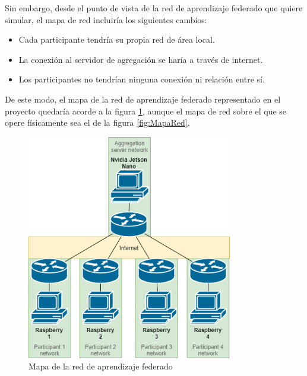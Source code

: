 Sin embargo, desde el punto de vista de la red de aprendizaje federado que quiere simular, el mapa de red incluiría los siguientes cambios:
\begin{itemize}
    \item Cada participante tendría su propia red de área local.
    \item La conexión al servidor de agregación se haría a través de internet.
    \item Los participantes no tendrían ninguna conexión ni relación entre sí.
\end{itemize}
De este modo, el mapa de la red de aprendizaje federado representado en el proyecto quedaría acorde a la figura \ref{fig:FLMapaRed}, aunque el mapa de red sobre el que se opere físicamente sea el de la figura \ref{fig:MapaRed}.

\begin{figure}[H]
    \centering
    \includegraphics[width=0.8\textwidth]{Figuras/FL_network_map.png}    
    \caption{Mapa de la red de aprendizaje federado} 
    \label{fig:FLMapaRed}
\end{figure}

\pagebreak

